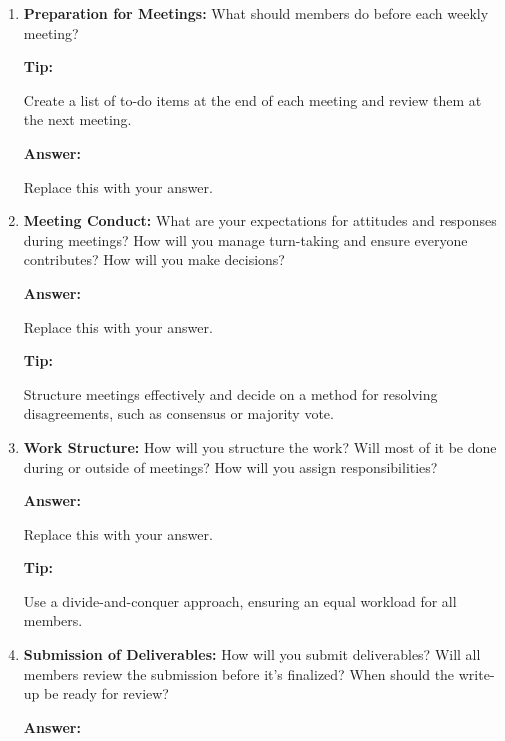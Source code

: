 \documentclass[12pt]{article}
\newenvironment{answer}[1][]{
  \color{blue}\textbf{Answer:}
}{}
\newenvironment{alice}[1][]{
  \color{black}\textbf{Tip:}
}{}
\begin{document}
\begin{enumerate}
\begin{answer}
\end{answer}

\item {\bf Preparation for Meetings:} What should members do before each weekly meeting?

\begin{alice}

Create a list of to-do items at the end of each meeting and review them at the next meeting.

\end{alice}

\begin{answer}

Replace this with your answer.
\end{answer}


\item {\bf Meeting Conduct:} What are your expectations for attitudes and responses during meetings? How will you manage turn-taking and ensure everyone contributes? How will you make decisions?

\begin{answer}

Replace this with your answer.
\end{answer}

\begin{alice}

Structure meetings effectively and decide on a method for resolving disagreements, such as consensus or majority vote.
\end{alice}

\item {\bf Work Structure:} How will you structure the work? Will most of it be done during or outside of meetings? How will you assign responsibilities?

\begin{answer}

Replace this with your answer.
\end{answer}

\begin{alice}

Use a divide-and-conquer approach, ensuring an equal workload for all members.
\end{alice}

\item {\bf Submission of Deliverables:} How will you submit deliverables? Will all members review the submission before it’s finalized? When should the write-up be ready for review?

\begin{answer}


\end{answer}
\end{enumerate}
\end{document}
